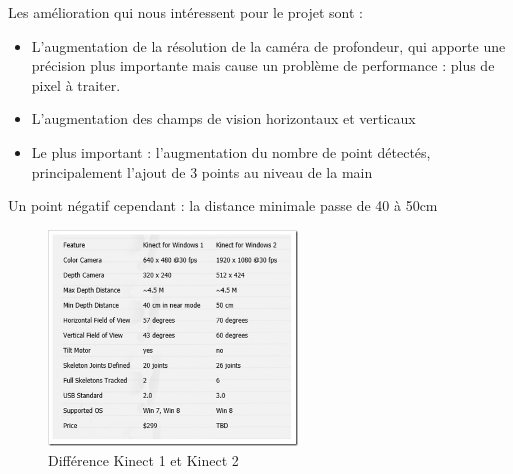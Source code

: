 Les amélioration qui nous intéressent pour le projet sont : 
\begin{itemize}
 \item L'augmentation de la résolution de la caméra de profondeur, qui apporte une précision plus importante mais cause un problème de performance : plus de pixel à traiter.
 \item L'augmentation des champs de vision horizontaux et verticaux
 \item Le plus important : l'augmentation du nombre de point détectés, principalement l'ajout de 3 points au niveau de la main
\end{itemize}

Un point négatif cependant : la distance minimale passe de 40 à 50cm 


\begin{figure}
  \begin{center}
    \includegraphics[width=250px]{images/Kinect1vs2.png}
    \caption{Différence Kinect 1 et Kinect 2}
    \label{fig:kinect1vs2}
  \end{center}
\end{figure}

